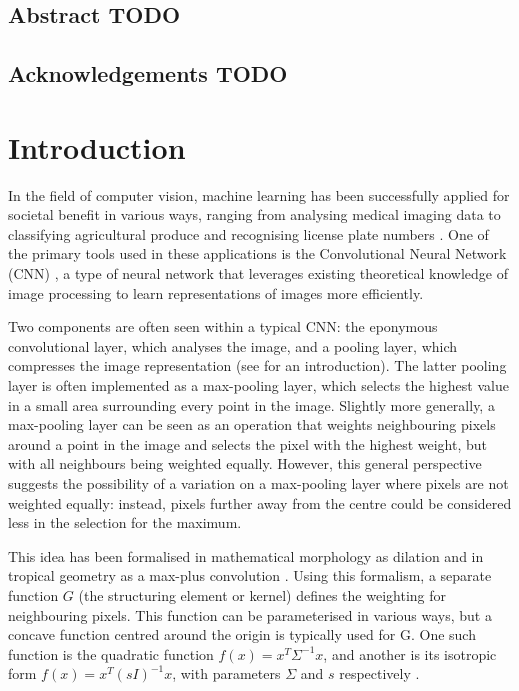 \documentclass[a4paper, 12pt]{report}
\def\comment#1{\color{red}#1\color{black}}
\begin{document}
\newpage



\setcounter{page}{1}
\pagestyle{plain} 


\section*{Abstract \comment{TODO}}


\section*{Acknowledgements \comment{TODO}}

\tableofcontents


\chapter{Introduction}
In the field of computer vision, machine learning has been successfully applied for societal benefit in various ways, ranging from analysing medical imaging data \cite{esteva2021deep, jain2015computer} to classifying agricultural produce \cite{wan2020faster, sivaranjani2022overview} and recognising license plate numbers \cite{xie2018new}. One of the primary tools used in these applications is the Convolutional Neural Network (CNN) \cite{le1990handwritten}, a type of neural network that leverages existing theoretical knowledge of image processing to learn representations of images more efficiently.

Two components are often seen within a typical CNN: the eponymous convolutional layer, which analyses the image, and a pooling layer, which compresses the image representation (see \cite{introconvnets} for an introduction). The latter pooling layer is often implemented as a max-pooling layer, which selects the highest value in a small area surrounding every point in the image. Slightly more generally, a max-pooling layer can be seen as an operation that weights neighbouring pixels around a point in the image and selects the pixel with the highest weight, but with all neighbours being weighted equally. However, this general perspective suggests the possibility of a variation on a max-pooling layer where pixels are not weighted equally: instead, pixels further away from the centre could be considered less in the selection for the maximum.

This idea has been formalised in mathematical morphology as dilation \cite{heijmans1996morphological} and in tropical geometry as a max-plus convolution \cite{maragos}. Using this formalism, a separate function $G$ (the structuring element or kernel) defines the weighting for neighbouring pixels. This function can be parameterised in various ways, but a concave function centred around the origin is typically used for G. One such function is the quadratic function $f(x)=x^T\Sigma^{-1}x$, and another is its isotropic form $f(x)=x^T(sI)^{-1}x$, with parameters $\Sigma$ and $s$ respectively \cite{Boomgaard1999NumericalSS}.
\end{document}
